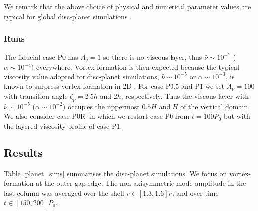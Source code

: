 We remark that the above choice of physical and numerical parameter
values are typical for global disc-planet simulations
\citep[e.g.][]{valborro06,mignone12}.   


\subsubsection{Runs} 
The fiducial case P0 has $A_\nu=1$ so there is no viscous layer, thus
$\hat{\nu}\sim 10^{-7}$ ($\alpha\sim 10^{-4}$) everywhere. Vortex
formation is then expected because the typical viscosity
value adopted for disc-planet simulations, $\hat{\nu}\sim 10^{-5}$ or
$\alpha\sim 10^{-3}$, is known to surpress vortex formation in 2D
\citep{valborro07, mudryk09}. 
For case P0.5 and P1 we set $A_\nu=100$ with transition angle $\zeta_\nu=2.5h$ and
$2h$, respectively. Thus the viscous layer with $\hat{\nu}\sim10^{-5}$
($\alpha\sim10^{-2}$) occupies the uppermost $0.5H$ and $H$ of the vertical
domain. %
We also consider case P0R, in which we restart case P0 from 
$t=100P_0$ but with the layered viscosity profile of case P1. 




\subsection{Results}
Table \ref{planet_sims} summarises the disc-planet simulations. 
We focus on vortex-formation at the outer gap edge. 
The non-axisymmetric mode amplitude in the last column was 
averaged over the shell $r\in[1.3,1.6]r_0$ and over time 
$t\in[150,200]P_0$. 



